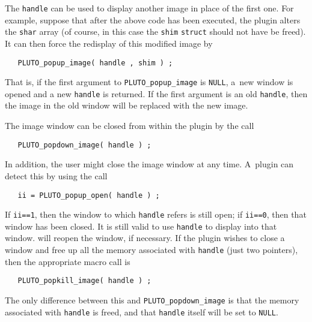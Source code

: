 The {\tt handle} can be used to display another image in place of
the first one.  For example, suppose that after the above code
has been executed, the plugin alters the {\tt shar} array
(of course, in this case the {\tt shim} {\tt struct} should
not have be freed).
It can then force the redisplay of this modified image by
\begin{verbatim}
   PLUTO_popup_image( handle , shim ) ;
\end{verbatim}
That is, if the first argument to {\tt PLUTO\_popup\_image} is {\tt NULL},
a~new window is opened and a new {\tt handle} is returned.  If the
first argument is an old {\tt handle}, then the image in the old
window will be replaced with the new image.

\vset
The image window can be closed from within the plugin by the call
\begin{verbatim}
   PLUTO_popdown_image( handle ) ;
\end{verbatim}
In addition, the user might close the image window at any time.
A~plugin can detect this by using the call
\begin{verbatim}
   ii = PLUTO_popup_open( handle ) ;
\end{verbatim}
If {\tt ii==1}, then the window to which {\tt handle} refers is still open;
if {\tt ii==0}, then that window has been closed.  It is still valid
to use {\tt handle} to display into that window.  \afnit will reopen
the window, if necessary.  If the plugin wishes to close a window
and free up all the memory associated with {\tt handle} (just two pointers), then
the appropriate macro call is
\begin{verbatim}
   PLUTO_popkill_image( handle ) ;
\end{verbatim}
The only difference between this and {\tt PLUTO\_popdown\_image} is
that the memory associated with {\tt handle} is freed, and that
{\tt handle} itself will be set to {\tt NULL}.

